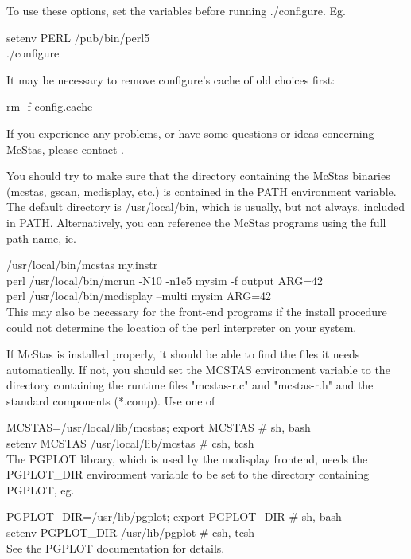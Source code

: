 \documentclass[a4paper,12pt]{article}
\begin{document}
To use these options, set the variables before running ./configure. Eg.

    setenv PERL /pub/bin/perl5\\
    ./configure

It may be necessary to remove configure's cache of old choices first:

    rm -f config.cache

If you experience any problems, or have some questions or ideas
concerning McStas, please contact .

You should try to make sure that the directory containing the McStas
binaries (mcstas, gscan, mcdisplay, etc.) is contained in the PATH
environment variable. The default directory is /usr/local/bin, which is
usually, but not always, included in PATH. Alternatively, you can
reference the McStas programs using the full path name, ie.

  /usr/local/bin/mcstas my.instr\\
  perl /usr/local/bin/mcrun -N10 -n1e5 mysim -f output ARG=42\\
  perl /usr/local/bin/mcdisplay --multi mysim ARG=42\\

This may also be necessary for the front-end programs if the install
procedure could not determine the location of the perl interpreter on
your system.

If McStas is installed properly, it should be able to find the files it
needs automatically. If not, you should set the MCSTAS environment
variable to the directory containing the runtime files "mcstas-r.c" and
"mcstas-r.h" and the standard components (*.comp). Use one of

  MCSTAS=/usr/local/lib/mcstas; export MCSTAS     \# sh, bash\\
  setenv MCSTAS /usr/local/lib/mcstas             \# csh, tcsh\\

The PGPLOT library, which is used by the mcdisplay frontend, needs the
PGPLOT\_DIR environment variable to be set to the directory containing
PGPLOT, eg.

  PGPLOT\_DIR=/usr/lib/pgplot; export PGPLOT\_DIR   \# sh, bash\\
  setenv PGPLOT\_DIR /usr/lib/pgplot               \# csh, tcsh\\

See the PGPLOT documentation for details.
\end{document}
